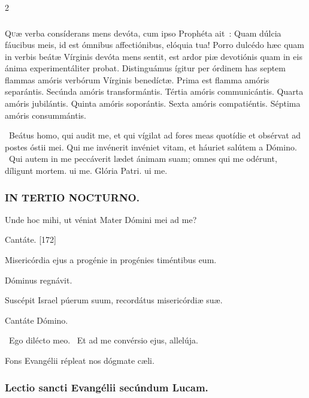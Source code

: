 \documentclass[9pt,twoside]{extarticle}
\begin{document}
\begin{multicols}{2}
{\subsubsection*{\center {}}
\lettrine{Q}uæ verba consíderans mens devóta, cum ipso Prophéta ait~: Quam dúlcia fáucibus meis, id est ómnibus affectiónibus, elóquia tua! Porro dulcédo hæc quam in verbis beátæ Vírginis devóta mens sentit, est ardor piæ devotiónis quam in eis ánima experimentáliter probat. Distinguámus ígitur per órdinem has septem flammas amóris verbórum Vírginis benedíctæ. Prima est flamma amóris separántis. Secúnda amóris transformántis. Tértia amóris communicántis. Quarta amóris jubilántis. Quinta amóris soporántis. Sexta amóris compatiéntis. Séptima amóris consummántis.

\begin{tightlist}{}
\item {}~Beátus homo, qui audit me, et qui vígilat ad fores meas quotídie et obsérvat ad postes óstii mei. \textred{*} Qui me invénerit invéniet vitam, et háuriet salútem a Dómino. ~Qui autem in me peccáverit lædet ánimam suam; omnes qui me odérunt, díligunt mortem. ui me. Glória Patri. ui me.
\end{tightlist}

\subsubsection*{\center \textsc{IN TERTIO NOCTURNO.}}
\begin{tightlist}{}
\item {} Unde hoc mihi, ut véniat Mater Dómini mei ad me?
\item {} Cantáte. [172]
\item {} Misericórdia ejus a progénie in progénies timéntibus eum.
\item {} Dóminus regnávit.
\item {} Suscépit Israel púerum suum, recordátus misericórdiæ suæ.
\item {} Cantáte Dómino.
\item {}~Ego dilécto meo. ~Et ad me convérsio ejus, allelúja.
\item {} Fons Evangélii répleat nos dógmate cæli.
\end{tightlist}

\subsubsection*{\center Lectio sancti Evangélii secúndum Lucam.}
}
\end{multicols}
\end{document}
